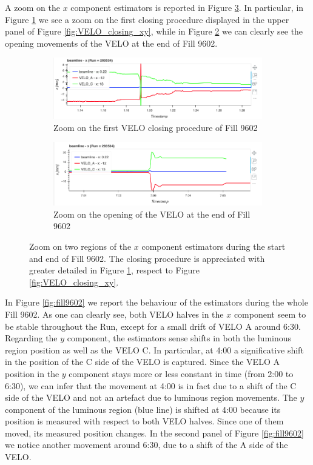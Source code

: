 A zoom on the $x$ component estimators is reported in Figure \ref{zoom_velo}. In particular, in Figure \ref{fig:velo_closing_zoom} we see a zoom on the first closing procedure displayed in the upper panel of Figure \ref{fig:VELO_closing_xy}, while in Figure \ref{fig:velo_opens_zoom} we can clearly see the opening movements of the VELO at the end of Fill 9602.

\begin{figure}
    \centering
    \begin{subfigure}{0.8\textwidth}
    \includegraphics[width=\linewidth]{figures/Velo_closing_zoom.png}
    \caption{Zoom on the first VELO closing procedure of Fill 9602}
    \label{fig:velo_closing_zoom}
    \end{subfigure}\hfill
    \begin{subfigure}{0.8\textwidth}
    \includegraphics[width=\linewidth]{figures/VELO_opens_zoom.png}
    \caption{Zoom on the opening of the VELO at the end of Fill 9602}
    \label{fig:velo_opens_zoom}
    \end{subfigure}
    \caption{Zoom on two regions of the $x$ component estimators during the start and end of Fill 9602. The closing procedure is appreciated with greater detailed in Figure \ref{fig:velo_closing_zoom}, respect to Figure \ref{fig:VELO_closing_xy}.}\label{zoom_velo}
\end{figure}
In Figure \ref{fig:fill9602} we report the behaviour of the estimators during the whole Fill 9602. As one can clearly see, both VELO halves in the $x$ component seem to be stable throughout the Run, except for a small drift of VELO A around 6:30. Regarding the $y$ component, the estimators sense shifts in both the luminous region position as well as the VELO C. In particular, at 4:00 a significative shift in the position of the C side of the VELO is captured. Since the VELO A position in the $y$ component stays more or less constant in time (from 2:00 to 6:30), we can infer that the movement at 4:00 is in fact due to a shift of the C side of the VELO and not an artefact due to luminous region movements. The $y$ component of the luminous region (blue line) is shifted at 4:00 because its position is measured with respect to both VELO halves. Since one of them moved, its measured position changes. In the second panel of Figure \ref{fig:fill9602} we notice another movement around 6:30, due to a shift of the A side of the VELO.
